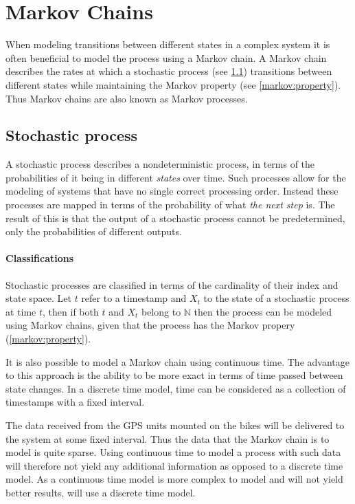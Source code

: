 \section{Markov Chains}\label{markov}
When modeling transitions between different states in a complex system it is often beneficial to model the process using a Markov chain.
A Markov chain describes the rates at which a stochastic process (see \cref{markov:stochastic}) transitions between different states while maintaining the Markov property (see \cref{markov:property}).
Thus Markov chains are also known as Markov processes.

\subsection{Stochastic process}\label{markov:stochastic}
A stochastic process describes a nondeterministic process, in terms of the probabilities of it being in different \emph{states} over time.
Such processes allow for the modeling of systems that have no single correct processing order.
Instead these processes are mapped in terms of the probability of what \emph{the next step} is.
The result of this is that the output of a stochastic process cannot be predetermined, only the probabilities of different outputs.

\paragraph{Classifications}
Stochastic processes are classified in terms of the cardinality of their index and state space.
Let $t$ refer to a timestamp and $X_t$ to the state of a stochastic process at time $t$, then if both $t$ and $X_t$ belong to $\mathbb{N}$ then the process can be modeled using Markov chains, given that the process has the Markov propery (\cref{markov:property}).

It is also possible to model a Markov chain using continuous time.
The advantage to this approach is the ability to be more exact in terms of time passed between state changes.
In a discrete time model, time can be considered as a collection of timestamps with a fixed interval.

The data received from the GPS units mounted on the bikes will be delivered to the system at some fixed interval.
Thus the data that the Markov chain is to model is quite sparse.
Using continuous time to model a process with such data will therefore not yield any additional information as opposed to a discrete time model.
As a continuous time model is more complex  to model and will not yield better results, \projectname{} will use a discrete time model.

